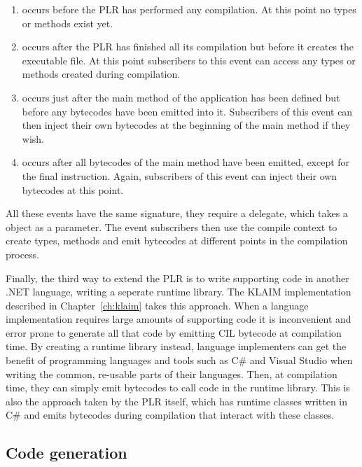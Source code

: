 	\begin{enumerate}
		\item {} occurs before the PLR has performed any 
		compilation. At this point no types or methods exist yet.
		
		\item {} occurs after the PLR has finished all its
		compilation but before it creates the executable file. At this point
		subscribers to this event can access any types or methods created during
		compilation.
		
		\item {} occurs just after the main method of the
		application has been defined but before any bytecodes have been emitted
		into it. Subscribers of this event can then inject their own bytecodes at 
		the beginning of the main method if they wish.
		
		\item {} occurs after all bytecodes of the main method
		have been emitted, except for the final  instruction. Again, 
		subscribers of this event can inject their own bytecodes at this point.
	\end{enumerate}
	
	All these events have the same signature, they require a 
	 delegate, which takes a  
	object as a parameter. The event subscribers then use the compile context to 
	create types, methods and emit bytecodes at different points in the 
	compilation process.
	
	Finally, the third way to extend the PLR is to write supporting code in
	another .NET language, writing a seperate runtime library. The KLAIM 
	implementation described in Chapter~\ref{ch:klaim} takes this approach. When 
	a language implementation requires large amounts of supporting code it is 
	inconvenient and error prone to generate all that code by emitting CIL 
	bytecode at compilation time. By creating a runtime library instead, 
	language implementers can get the benefit of programming languages and tools 
	such as C\# and Visual Studio when writing the common, re-usable parts of 
	their languages. Then, at compilation time, they can simply emit bytecodes 
	to call code in the runtime library. This is also the approach taken by the 
	PLR itself, which has runtime classes written in C\# and emits bytecodes 
	during compilation that interact with these classes.	

\subsection{Code generation}
	
